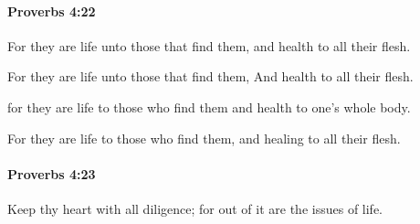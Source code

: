 		\paragraph{Proverbs 4:22} %
			\label{PROVERBS-4-22}

			For they are life unto those that find them, and health to all their flesh.

			\begin{versebox}
					\item[BHS] 
					\item[ASV] For they are life unto those that find them, And health to all their flesh.
					\item[NIV] for they are life to those who find them and health to one’s whole body.
					\item[NRSV] For they are life to those who find them, and healing to all their flesh.
			\end{versebox}

		\paragraph{Proverbs 4:23} %
			\label{PROVERBS-4-23}

			Keep thy heart with all diligence; for out of it are the issues of life.

